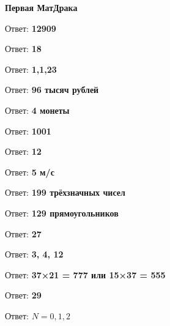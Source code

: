 \centerline{\bf \Huge Первая МатДрака }

Ответ: \textbf{12909}

Ответ: \textbf{18}

Ответ: \textbf{1,1,23}

Ответ: \textbf{96 тысяч рублей}

Ответ: \textbf{4 монеты}

Ответ: \textbf{1001}

Ответ: \textbf{12}

Ответ: \textbf{5 м/с}

Ответ: \textbf{199 трёхзначных чисел}

Ответ: \textbf{129 прямоугольников}

Ответ: \textbf{27}

Ответ: \textbf{3, 4, 12}

Ответ: \textbf{37×21 = 777 или 15×37 = 555}

Ответ: \textbf{29}

Ответ: \textbf{$N = 0, 1, 2$}